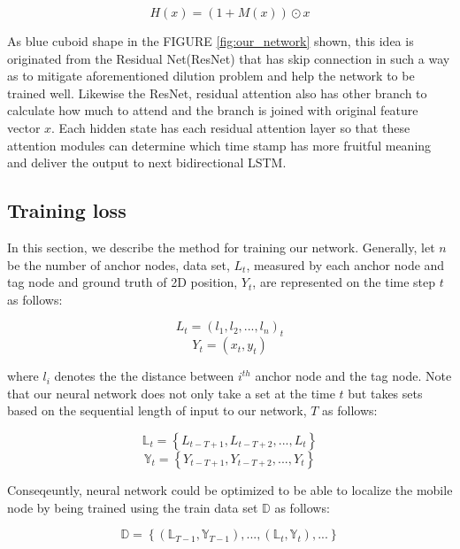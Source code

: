 \documentclass[letterpaper, 10 pt, conference]{ieeeconf}  %
\begin{document}
\begin{equation}
H(x)=\left(1+M(x)\right)\odot x
\end{equation} 

As blue cuboid shape in the FIGURE \ref{fig:our_network} shown, this idea is originated from the Residual Net(ResNet)\cite{he2016deep} that has skip connection in such a way as to mitigate aforementioned dilution problem and help the network to be trained well. Likewise the ResNet, residual attention also has other branch to calculate how much to attend and the branch is joined with original feature vector $x$. Each hidden state has each residual attention layer so that these attention modules can determine which time stamp has more fruitful meaning and deliver the output to next bidirectional LSTM.

\subsection{Training loss}

In this section, we describe the method for training our network. Generally, let $n$ be the number of anchor nodes, data set, $L_{t}$, measured by each anchor node and tag node and ground truth of 2D position, $Y_t$, are represented on the time step $t$ as follows:

\begin{equation}
L_{t} = (l_{1}, l_{2}, ..., l_{n})_{t}
\end{equation}
\begin{equation}
Y_t = (x_t, y_t)
\end{equation}

where $l_{i}$ denotes the the distance between $i^{th}$ anchor node and the tag node. Note that our neural network does not only take a set at the time $t$ but takes sets based on the sequential length of input to our network, $T$ as follows:

\begin{equation}
\mathbb{L}_t = \left\{L_{t-T+1}, L_{t-T+2}, ..., L_t\right\} 
\end{equation}
\begin{equation}
\mathbb{Y}_t = \left\{Y_{t-T+1}, Y_{t-T+2}, ..., Y_t\right\}
\end{equation}

Conseqeuntly, neural network could be optimized to be able to localize the mobile node by being trained using the train data set $\mathbb{D}$ as follows:  

\begin{equation}
\mathbb{D} = \left\{(\mathbb{L}_{T-1}, \mathbb{Y}_{T-1}),...,(\mathbb{L}_t, \mathbb{Y}_t),...\right\} 
\end{equation}
\end{document}
